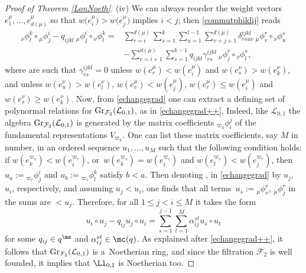 \begin{proof}[Proof of Theorem \ref{LonNoeth}]
(iv) We can always reorder the weight vectors $e_1^\mu,\dots,e_{d(\mu)}^\mu$ so that $w\big(e_i^\mu\big) > w\big(e_j^\mu\big)$ implies $i < j$; then \eqref{commutphiklij} reads
\begin{align}
{}_{{\nu}}\phi^k_l \circ {}_{{\mu}}\phi^i_j - q_{ijkl} \ {}_{{\mu}}\phi^i_j\circ {}_{{\nu}}\phi^k_l ={}& \sum_{r=i}^{d(\mu)}\sum_{s=1}^k \sum_{u=1}^{l-1} \sum_{v=j+1}^{d(\mu)} \delta^{ijkl}_{rsuv} \ {}_{\mu}\phi^r_v \circ {}_{{\nu}}\phi^s_u \nonumber\\
 & - \sum_{r=i+1}^{d(\mu)}\sum_{s=1}^{k-1} q_{ijkl}\gamma_{rs}^{ijkl} \ {}_{\mu}\phi^r_j \circ {}_{{\nu}}\phi^s_l, \label{echangegrad}
\end{align}
where  are such that $\gamma_{rs}^{ijkl}=0$ unless $w(e_r^\mu) < w(e_i^\mu)$ and $w(e_s^\nu) > w(e_k^\nu)$, and  unless $w(e_u^\nu) > w(e_l^\nu)$, $w(e_v^\mu) < w(e_j^\mu)$, $w(e_r^\mu) \leq w(e_i^\mu)$ and $w(e_s^\nu) \geq w(e_k^\nu)$. Now, from \eqref{echangegrad} one can extract a defining set of polynormal relations for $ {\rm Gr}_{{\mathcal F}_2}({\mathcal L}_{0,1})$, as in \eqref{echangegrad++}. Indeed, like ${\mathcal L}_{0,1}$ the algebra $ {\rm Gr}_{{\mathcal F}_2}({\mathcal L}_{0,1})$ is generated by the matrix coefficients ${}_{{\varpi_k}} \phi_i^j$ of the fundamental representations $V_{\varpi_k}$. One can list these matrix coefficients, say $M$ in number, in an ordered sequence $u_1,\dots,u_M$ such that the following condition holds: if $w(e_k^{\varpi_s}) < w(e_i^{\varpi_r})$, or~${w(e_k^{\varpi_s}) = w(e_i^{\varpi_r})}$ and $w(e_l^{\varpi_s}) < w(e_j^{\varpi_r})$, then $u_a:={}_{{\varpi_r}} \phi^i_j$ and $u_b:={}_{{\varpi_s}} \phi^k_l$ satisfy $b<a$. Then denoting ,  in \eqref{echangegrad} by $u_j$, $u_i$, respectively, and assuming $u_j<u_i$, one finds that all terms~${u_s:= {}_{\mu}\phi^r_v}$, ${}_{\mu}\phi^r_j$ in the sums are $< u_j$. Therefore, for all $1\leq j<i\leq M$ it takes the form
\begin{equation}\label{echangegrad+}
u_i\circ u_j - q_{ij} u_j\circ u_i = \sum_{s=1}^{j-1}\sum_{t=1}^M \alpha_{ij}^{st} u_s\circ u_t
\end{equation}
for some $q_{ij}\in q^{\mz}$ and $\alpha_{ij}^{st}\in \mc(q)$. As explained after \eqref{echangegrad++}, it follows that $ {\rm Gr}_{{\mathcal F}_2}({\mathcal L}_{0,1})$ is a~Noetherian ring, and since the filtration $\mathcal{F}_2$ is well founded, it implies that $\Ll_{0,1}$ is Noetherian too.


\end{proof}
